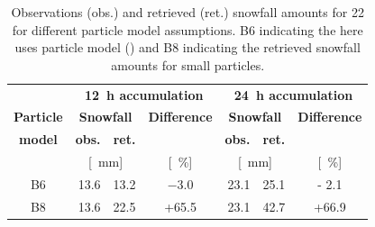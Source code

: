 \begin{table}[t]
	\begin{center}
		\caption{Observations (obs.) and retrieved (ret.) snowfall amounts for \SI{22}{\dec} for different particle model assumptions. B6 indicating the here uses particle model () and B8 indicating the retrieved snowfall amounts for small particles.}\label{tab:res:ret_sens}
		\begin{tabular}{c||r|r|c||r|r|c}
			\hline \hline
			& \multicolumn{3}{c||}{\textbf{\SI{12}{\hour} accumulation}} & \multicolumn{3}{c}{\textbf{\SI{24}{\hour} accumulation}}    \\\cline{2-7}
			\textbf{Particle} & \multicolumn{2}{c|}{\textbf{Snowfall}} & \textbf{Difference} &  \multicolumn{2}{c|}{\textbf{Snowfall}} & \textbf{Difference}   \\\cline{2-3} \cline{5-6}
			\textbf{model} & \textbf{obs.} & \textbf{ret.} && \textbf{obs.} & \textbf{ret.} &  \\\cline{2-7}
			& \multicolumn{2}{c|}{[\SI{}{\mm}]} & [\SI{}{\percent}]  & \multicolumn{2}{c|}{[\SI{}{\mm}]} & [\SI{}{\percent}]  \\ \hline\hline
			B6  & \num{13.6} &\num{13.2} & \num{-3.0} & \num{23.1} & \num{25.1} & \num{- 2.1}  \\\hline
			B8  & \num{13.6} &\num{22.5} & +\num{65.5} & \num{23.1} & \num{42.7} & +\num{66.9}  \\\hline\hline
		\end{tabular}
	\end{center}
\end{table}

